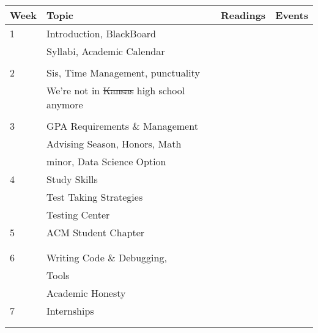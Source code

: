 \begin{center}\begin{tabular}{|l|l|l|l|}\hline
  Week & Topic                          & Readings      & Events \\\hline
  1 & Introduction, BlackBoard          &               &  \\
    & Syllabi, Academic Calendar        &               &  \\
    & \hspace*{6cm}                     &               &  \\\hline
  2 & Sis, Time Management, punctuality &               &  \\
    & We're not in \st{Kansas} high school anymore  &               &  \\
    &                                   &               &  \\\hline
  3 & GPA Requirements \& Management    &               &  \\
    & Advising Season, Honors, Math     &               &  \\
    & minor, Data Science Option        &               &  \\\hline
  4 & Study Skills                      &               &  \\ 
    & Test Taking Strategies            &               &  \\
    & Testing Center                    &               &  \\\hline
  5 & ACM Student Chapter               &               &  \\ %
    &                                   &               &  \\
    &                                   &               &  \\\hline
  6 & Writing Code \& Debugging,        &               &  \\
    & Tools                             &               &  \\
    & Academic Honesty                  &               &  \\\hline
  7 & Internships                       &               &  \\ %
    &                                   &               &  \\
    &                                   &               &  \\\hline

\end{tabular}
\end{center}

